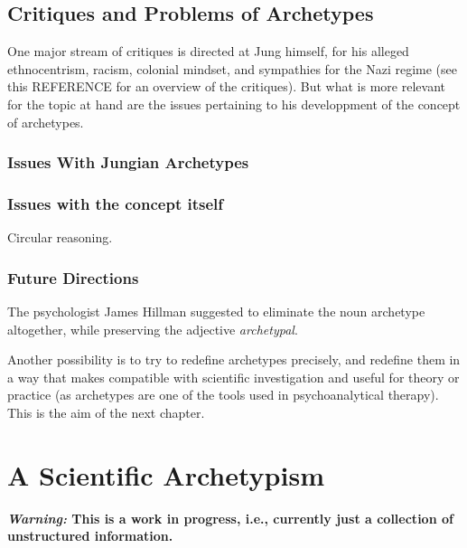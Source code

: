 \documentclass[
]{book}
\begin{document}
\hypertarget{critiques-and-problems-of-archetypes}{%
\section{Critiques and Problems of Archetypes}\label{critiques-and-problems-of-archetypes}}

One major stream of critiques is directed at Jung himself, for his alleged ethnocentrism, racism, colonial mindset, and sympathies for the Nazi regime (see this REFERENCE for an overview of the critiques). But what is more relevant for the topic at hand are the issues pertaining to his developpment of the concept of archetypes.

\hypertarget{issues-with-jungian-archetypes}{%
\subsection{Issues With Jungian Archetypes}\label{issues-with-jungian-archetypes}}

\hypertarget{issues-with-the-concept-itself}{%
\subsection{Issues with the concept itself}\label{issues-with-the-concept-itself}}

Circular reasoning.

\hypertarget{future-directions}{%
\subsection{Future Directions}\label{future-directions}}

The psychologist James Hillman suggested to eliminate the noun archetype altogether, while preserving the adjective \emph{archetypal}.

Another possibility is to try to redefine archetypes precisely, and redefine them in a way that makes compatible with scientific investigation and useful for theory or practice (as archetypes are one of the tools used in psychoanalytical therapy). This is the aim of the next chapter.

\hypertarget{a-scientific-archetypism}{%
\chapter{A Scientific Archetypism}\label{a-scientific-archetypism}}

\textbf{\emph{Warning:} This is a work in progress, i.e., currently just a collection of unstructured information.}
\end{document}
